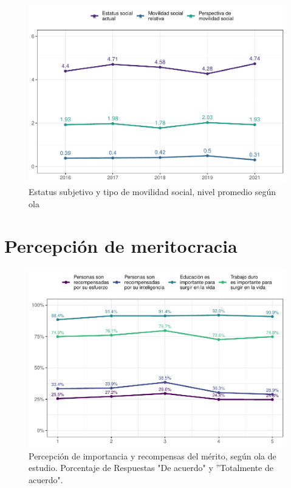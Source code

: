 \documentclass[
  12pt,
  openany]{book}
\begin{document}
\begin{figure}

{\centering \includegraphics{reporte-elsoc_files/figure-latex/mov-soc-1} 

}

\caption{Estatus subjetivo y tipo de movilidad social, nivel promedio según ola}\label{fig:mov-soc}
\end{figure}

\hypertarget{percepciuxf3n-de-meritocracia}{%
\section{Percepción de meritocracia}\label{percepciuxf3n-de-meritocracia}}

\begin{figure}

{\centering \includegraphics{reporte-elsoc_files/figure-latex/merit-wave-1} 

}

\caption{Percepción de importancia y recompensas del mérito, según ola de estudio. Porcentaje de Respuestas "De acuerdo" y ”Totalmente de acuerdo".}\label{fig:merit-wave}
\end{figure}
\end{document}
